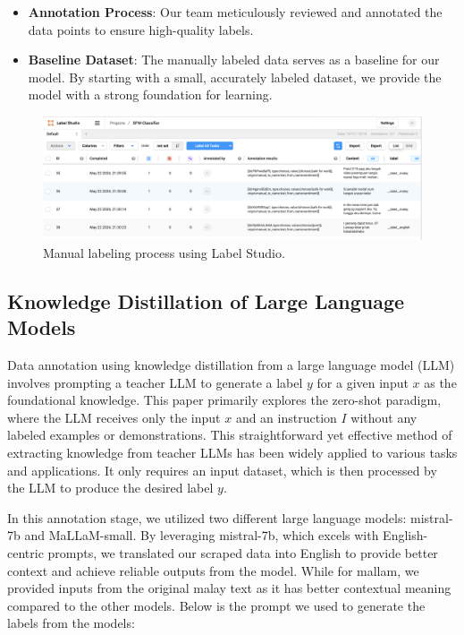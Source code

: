 \documentclass[preprint]{article}
\begin{document}
\begin{itemize}
    \item \textbf{Annotation Process}: Our team meticulously reviewed and annotated the data points to ensure high-quality labels. 
    \item \textbf{Baseline Dataset}: The manually labeled data serves as a baseline for our model. By starting with a small, accurately labeled dataset, we provide the model with a strong foundation for learning.
\end{itemize}

\begin{figure}[h]
  \centering
  \includegraphics[width=0.6\linewidth]{img/labelstudio.png}
  \caption{Manual labeling process using Label Studio.}
\end{figure}

\subsection{Knowledge Distillation of Large Language Models}

Data annotation using knowledge distillation from a large language model (LLM) involves prompting a teacher LLM to generate a label \( y \) for a given input \( x \) as the foundational knowledge. This paper primarily explores the zero-shot paradigm, where the LLM receives only the input \( x \) and an instruction \( I \) without any labeled examples or demonstrations. This straightforward yet effective method of extracting knowledge from teacher LLMs has been widely applied to various tasks and applications. It only requires an input dataset, which is then processed by the LLM to produce the desired label \( y \).

In this annotation stage, we utilized two different large language models: mistral-7b and MaLLaM-small. By leveraging mistral-7b, which excels with English-centric prompts, we translated our scraped data into English to provide better context and achieve reliable outputs from the model. While for mallam, we provided inputs from the original malay text as it has better contextual meaning compared to the other models. Below is the prompt we used to generate the labels from the models:
\end{document}
